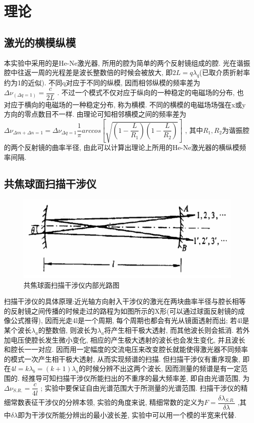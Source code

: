 \documentclass[aps,pre,12pt,preprint,%
	onecolumn,showpacs,showkeys,nofootinbib]{revtex4-2}
\begin{document}
\section{理论}
\subsection{激光的横模纵模}
本实验中采用的是He-Ne激光器, 所用的腔为简单的两个反射镜组成的腔. 光在谐振腔中往返一周的光程差是波长整数倍的时候会被放大, 即$2L=q\lambda_q$(已取介质折射率约为1的近似). 不同q对应于不同的纵模, 因而相邻纵模的频率差为$\Delta \nu_(\Delta q=1)=\dfrac{c}{2L}$ . 不过一个模式不仅对应于纵向的一种稳定的电磁场的分布, 也对应于横向的电磁场的一种稳定分布, 称为横模. 不同的横模的电磁场场强在x或y方向的零点数目不一样. 由理论可知相邻横模之间的频率差为$\Delta \nu_{\Delta m+\Delta n=1}=\Delta \nu_{\Delta q=1} {\dfrac{1}{\pi}  arccos⁡[\sqrt{(1-\dfrac{L}{R_1})(1-\dfrac{L}{R_2})}]}$ , 其中$R_1,R_2$为谐振腔的两个反射镜的曲率半径, 由此可以计算出理论上所用的He-Ne激光器的横纵模频率间隔. 
\subsection{共焦球面扫描干涉仪}
	\begin{figure}[!h]
	\centering
	\includegraphics[width=.8\linewidth]{img/1.png}
	\caption[共焦球面扫描干涉仪内部光路图]{共焦球面扫描干涉仪内部光路图}\vspace{1ex}
	\end{figure}
扫描干涉仪的具体原理:近光轴方向射入干涉仪的激光在两块曲率半径与腔长相等的反射镜之间传播的时候走过的路程为如图所示的X形(可以通过球面反射镜的成像公式推得), 因而光走4l是一个周期, 每个周期也都会有光从镜面透射而出; 若4l是某个波长$\lambda_a$的整数倍, 则波长为$\lambda_a$将产生相干极大透射, 而其他波长则会抵消. 若外加电压使腔长发生微小变化, 相应的产生极大透射的波长也会发生变化, 并且波长和腔长一一对应. 因而用一定幅度的交流电压来改变腔长就能使得激光器不同频率的模式一次产生相干极大透射, 从而实现频谱的扫描. 但扫描干涉仪有重序现象, 即在$4l=k\lambda_b=(k+1)\lambda_a$的时候分辨不出这两个波长, 因而测量的频谱是有一定范围的. 经推导可知扫描干涉仪所能扫出的不重序的最大频率差, 即自由光谱范围, 为$\Delta\nu_{S.R.}=\dfrac{c}{4l}$ ; 实验中要保证自由光谱范围大于所测量的光谱范围. 扫描干涉仪的精细常数表征干涉仪的分辨本领, 实验的角度来说, 精细常数的定义为$F=\dfrac{\delta\lambda_{S.R.}}{\delta\lambda}$ ,其中$\delta\lambda$即为干涉仪所能分辨出的最小波长差, 实验中可以用一个模的半宽来代替.
\end{document}
